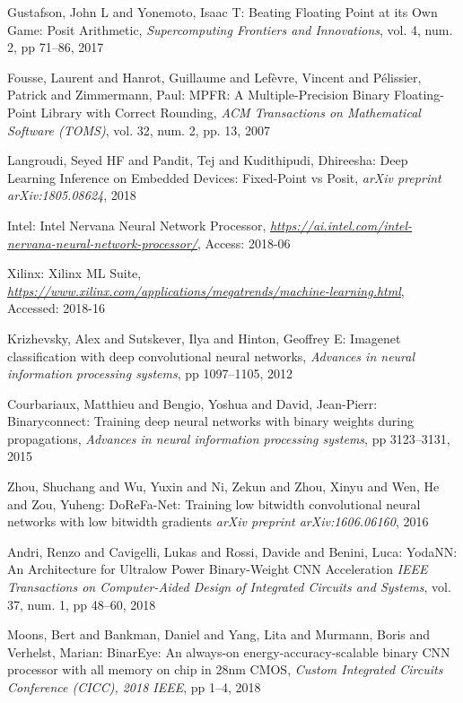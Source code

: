 \documentclass[techrep,english]{ipsj} %
\begin{document}
\begin{thebibliography}{99}
  Gustafson, John L and Yonemoto, Isaac T:
  Beating Floating Point at its Own Game: Posit Arithmetic,
  {\it Supercomputing Frontiers and Innovations},
  vol. 4, num. 2, pp 71--86, 2017

  Fousse, Laurent and Hanrot, Guillaume and Lef{\`e}vre, Vincent and P{\'e}lissier, Patrick and Zimmermann, Paul:
  MPFR: A Multiple-Precision Binary Floating-Point Library with Correct Rounding,
  {\it ACM Transactions on Mathematical Software (TOMS)},
  vol. 32, num. 2, pp. 13, 2007


  Langroudi, Seyed HF and Pandit, Tej and Kudithipudi, Dhireesha:
  Deep Learning Inference on Embedded Devices: Fixed-Point vs Posit,
  {\it arXiv preprint arXiv:1805.08624},
  2018

  Intel:
  Intel Nervana Neural Network Processor,
  {\it \url{https://ai.intel.com/intel-nervana-neural-network-processor/}},
  Access: 2018-06

  Xilinx:
  Xilinx ML Suite,
  {\it \url{https://www.xilinx.com/applications/megatrends/machine-learning.html}},
  Accessed: 2018-16

  Krizhevsky, Alex and Sutskever, Ilya and Hinton, Geoffrey E:
  Imagenet classification with deep convolutional neural networks,
  {\it Advances in neural information processing systems},
  pp 1097–1105, 2012

  Courbariaux, Matthieu and Bengio, Yoshua and David, Jean-Pierr:
  Binaryconnect: Training deep neural networks with binary weights during propagations,
  {\it Advances in neural information processing systems},
  pp 3123–3131, 2015

  Zhou, Shuchang and Wu, Yuxin and Ni, Zekun and Zhou, Xinyu and Wen, He and Zou, Yuheng:
  DoReFa-Net: Training low bitwidth convolutional neural networks with low bitwidth gradients
  {\it  arXiv preprint arXiv:1606.06160},
  2016

  Andri, Renzo and Cavigelli, Lukas and Rossi, Davide and Benini, Luca:
  YodaNN: An Architecture for Ultralow Power Binary-Weight CNN Acceleration
  {\it IEEE Transactions on Computer-Aided Design of Integrated Circuits and Systems},
  vol. 37, num. 1, pp 48–60, 2018

  Moons, Bert and Bankman, Daniel and Yang, Lita and Murmann, Boris and Verhelst, Marian:
  BinarEye: An always-on energy-accuracy-scalable binary CNN processor with all memory on chip in 28nm CMOS,
  {\it Custom Integrated Circuits Conference (CICC), 2018 IEEE},
  pp 1–4, 2018



\end{thebibliography}
\end{document}
